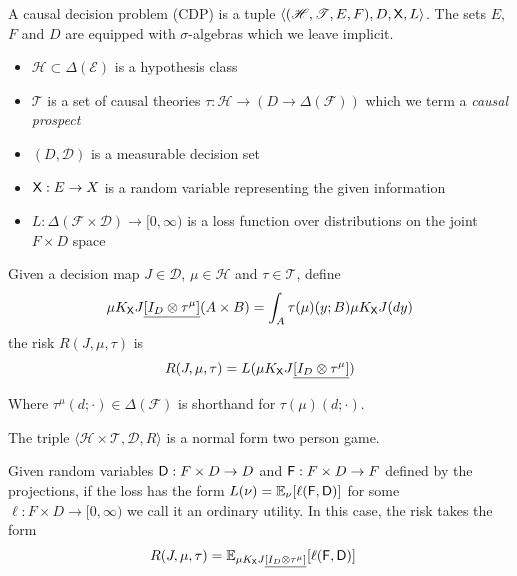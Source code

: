 \begin{definition}
A causal decision problem (CDP) is a tuple $\langle (\mathscr{H}, \mathscr{T}, E, F), D, \mathsf{X}, L \rangle$. The sets $E$, $F$ and $D$ are equipped with $\sigma$-algebras which we leave implicit.

\begin{itemize}
    \item $\mathscr{H}\subset \Delta(\mathcal{E})$ is a hypothesis class
    \item $\mathscr{T}$ is a set of causal theories $\tau:\mathscr{H}\to ( D\to \Delta(\mathcal{F}))$ which we term a \emph{causal prospect}
    \item $(D,\mathcal{D})$ is a measurable decision set
    \item $\mathsf{X}:E\to X$ is a random variable representing the given information
    \item $L:\Delta(\mathcal{F}\times\mathcal{D})\to [0,\infty)$ is a loss function over distributions on the joint $F\times D$ space
\end{itemize}

Given a decision map $J\in\mathscr{D}$, $\mu\in \mathscr{H}$ and $\tau\in \mathscr{T}$, define 
\begin{align}
    \mu K_{\mathsf{X}} J\underline{[I_D\otimes \tau^\mu]}(A\times B) = \int_A \tau(\mu)(y;B) \mu K_{\mathsf{X}} J(dy)
\end{align}
the risk $R(J,\mu,\tau)$ is
\begin{align}
    R(J,\mu,\tau) = L(\mu K_{\mathsf{X}} J\underline{[I_D\otimes \tau^\mu]}) 
\end{align}

Where $\tau^\mu(d;\cdot)\in \Delta(\mathcal{F})$ is shorthand for $\tau(\mu)(d;\cdot)$.

The triple $\langle \mathscr{H}\times\mathscr{T}, \mathscr{D}, R\rangle$ is a normal form two person game.

Given random variables $\mathsf{D}:F\times D\to D$ and $\mathsf{F}:F\times D\to F$ defined by the projections, if the loss has the form $L(\nu) = \mathbb{E}_{\nu}[\ell(\mathsf{F},\mathsf{D})]$ for some $\ell:F\times D\to [0,\infty)$ we call it an ordinary utility. In this case, the risk takes the form
\begin{align}
    R(J,\mu,\tau) &= \mathbb{E}_{\mu K_{\mathsf{X}} J\underline{[I_D\otimes \tau^\mu]}}[\ell(\mathsf{F},\mathsf{D})]
\end{align}


\end{definition}

